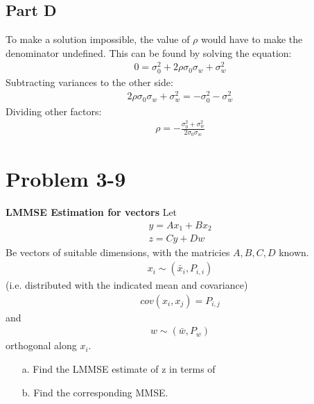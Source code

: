 \documentclass{article}
\begin{document}
\subsection*{Part D}
To make a solution impossible, the value of $\rho$ would have to make the denominator undefined. This can be found by solving the equation:
\begin{align*}
0=\sigma^2_0+ 2\rho\sigma_0\sigma_w + \sigma^2_w
\end{align*}
Subtracting variances to the other side:
\begin{align*}
2\rho\sigma_0\sigma_w + \sigma^2_w = -\sigma^2_0 -\sigma^2_w
\end{align*}
Dividing other factors:
\begin{align*}
\boxed{ \rho = -\frac{\sigma^2_0+\sigma^2_w}{2\sigma_0\sigma_w} }
\end{align*}
\clearpage

\section*{Problem 3-9}
\textbf{LMMSE Estimation for vectors}
Let 
\begin{align*}
y=A x_1 + B x_2 \\
z = C y+ D w
\end{align*}
Be vectors of suitable dimensions, with the matricies $A, B, C, D$ known.
\begin{align*}
x_i \sim (\bar{x}_i,P_{i,i})
\end{align*}
(i.e. distributed with the indicated mean and covariance)
\begin{align*}
cov(x_i,x_j) = P_{i,j}
\end{align*}
and 
\begin{align*}
w \sim (\bar{w}, P_w) 
\end{align*}
orthogonal along $x_i$.
\begin{enumerate}
\item[a.] Find the LMMSE estimate of z in terms of 
\item[b.] Find the corresponding MMSE.
\end{enumerate}
\end{document}
